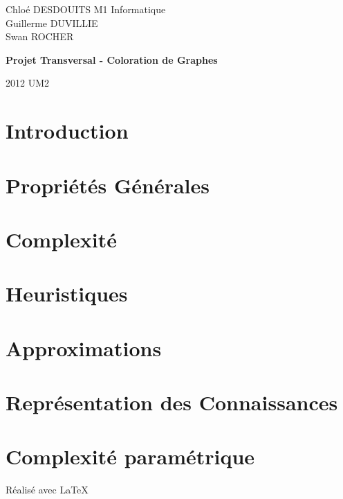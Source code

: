 \documentclass[a4paper]{report}
\begin{document}
\large
\setlength{\parskip}{5mm plus3mm minus3mm}
 
{\setlength{\parindent}{0cm}
Chlo\'e DESDOUITS \hfill M1 Informatique \\
Guillerme DUVILLIE \\
Swan ROCHER
}
\vfill
{\centering \Huge \bfseries Projet Transversal - Coloration de Graphes\par}
\vfill
2012 \hfill UM2

\tableofcontents
\thispagestyle{empty}


\chapter{Introduction}\label{chap1}


\chapter{Propri\'et\'es G\'en\'erales}\label{chap2}


\chapter{Complexité}


\chapter{Heuristiques}\label{chap4}


\chapter{Approximations}\label{chap5}






\chapter{Repr\'esentation des Connaissances}\label{chap9}


\chapter{Complexité paramétrique}\label{chap10}


\vfill
{\raggedleft R\'ealis\'e avec \LaTeX{} \par}
\end{document}
